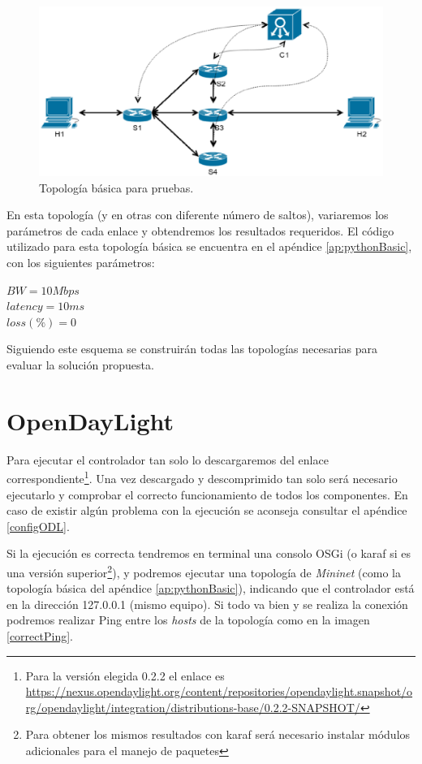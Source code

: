 \documentclass[a4paper,11pt]{book}
\begin{document}
\begin{figure}[tb]
\centering
\includegraphics[scale=0.7]{./figuras/topoBasic}
\caption{Topología básica para pruebas.}\label{topologyBasic}
\end{figure}

En esta topología (y en otras con diferente número de saltos), variaremos los parámetros de cada enlace y obtendremos los resultados requeridos. El código utilizado para esta topología básica se encuentra en el apéndice \ref{ap:pythonBasic}, con los siguientes parámetros:

\begin{center}
$BW = 10 Mbps $     \\  $latency = 10 ms$ \\ $loss(\%) = 0$
\end{center}

Siguiendo este esquema se construirán todas las topologías necesarias para evaluar la solución propuesta.

\section{OpenDayLight}
Para ejecutar el controlador tan solo lo descargaremos del enlace correspondiente\footnote{Para la versión elegida 0.2.2 el enlace es \url{https://nexus.opendaylight.org/content/repositories/opendaylight.snapshot/org/opendaylight/integration/distributions-base/0.2.2-SNAPSHOT/}}. Una vez descargado y descomprimido tan solo será necesario ejecutarlo y comprobar el correcto funcionamiento de todos los componentes. En caso de existir algún problema con la ejecución se aconseja consultar el apéndice \ref{configODL}. 

Si la ejecución es correcta tendremos en terminal una consolo OSGi (o karaf si es una versión superior\footnote{Para obtener los mismos resultados con karaf será necesario instalar módulos adicionales para el manejo de paquetes}), y podremos ejecutar una topología de \emph{Mininet} (como la topología básica del apéndice \ref{ap:pythonBasic}), indicando que el controlador está en la dirección 127.0.0.1 (mismo equipo). Si todo va bien y se realiza la conexión podremos realizar Ping entre los \textit{hosts} de la topología como en la imagen \ref{correctPing}.
\end{document}
